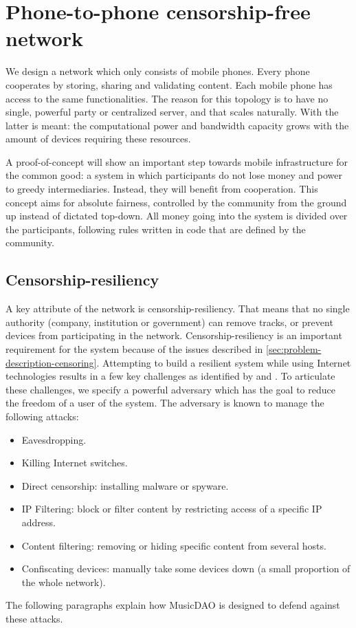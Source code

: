 \section{Phone-to-phone censorship-free network}
We design a network which only consists of mobile phones. Every phone cooperates by storing, sharing and validating content. Each mobile phone has access to the same functionalities. The reason for this topology is to have no single, powerful party or centralized server, and that scales naturally. With the latter is meant: the computational power and bandwidth capacity grows with the amount of devices requiring these resources.

A proof-of-concept will show an important step towards mobile infrastructure for the common good: a system in which participants do not lose money and power to greedy intermediaries. Instead, they will benefit from cooperation. This concept aims for absolute fairness, controlled by the community from the ground up instead of dictated top-down. All money going into the system is divided over the participants, following rules written in code that are defined by the community.

\subsection{Censorship-resiliency}
A key attribute of the network is censorship-resiliency. That means that no single authority (company, institution or government) can remove tracks, or prevent devices from participating in the network. Censorship-resiliency is an important requirement for the system because of the issues described in \ref{sec:problem-description-censoring}. Attempting to build a resilient system while using Internet technologies results in a few key challenges as identified by \cite{pouwelse2012censorship} and \cite{di2014bypassing}. To articulate these challenges, we specify a powerful adversary which has the goal to reduce the freedom of a user of the system. The adversary is known to manage the following attacks:
\begin{itemize}
    \item Eavesdropping.
    \item Killing Internet switches. 
    \item Direct censorship: installing malware or spyware.
    \item IP Filtering: block or filter content by restricting access of a specific IP address.
    \item Content filtering: removing or hiding specific content from several hosts.
    \item Confiscating devices: manually take some devices down (a small proportion of the whole network).
\end{itemize}
The following paragraphs explain how MusicDAO is designed to defend against these attacks.

